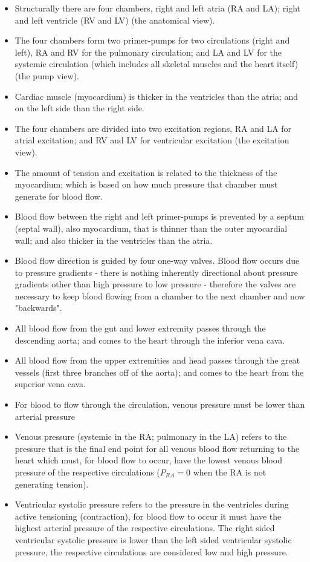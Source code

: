 \begin{itemize}
    \item Structurally there are four chambers, right and left atria (RA and LA); right and left ventricle (RV and LV) (the anatomical view).
    \item The four chambers form two primer-pumps for two circulations (right and left), RA and RV for the pulmonary circulation; and LA and LV for the systemic circulation (which includes all skeletal muscles and the heart itself) (the pump view).
    \item Cardiac muscle (myocardium) is thicker in the ventricles than the atria; and on the left side than the right side.
    \item The four chambers are divided into two excitation regions, RA and LA for atrial excitation; and RV and LV for ventricular excitation (the excitation view).
    \item The amount of tension and excitation is related to the thickness of the myocardium; which is based on how much pressure that chamber must generate for blood flow.
    \item Blood flow between the right and left primer-pumps is prevented by a septum (septal wall), also myocardium, that is thinner than the outer myocardial wall; and also thicker in the ventricles than the atria.
    \item Blood flow direction is guided by four one-way valves. Blood flow occurs due to pressure gradients - there is nothing inherently directional about pressure gradients other than high pressure to low pressure - therefore the valves are necessary to keep blood flowing from a chamber to the next chamber and now "backwards".
    \item All blood flow from the gut and lower extremity passes through the descending aorta; and comes to the heart through the inferior vena cava.
    \item All blood flow from the upper extremities and head passes through the great vessels (first three branches off of the aorta); and comes to the heart from the superior vena cava.
    \item For blood to flow through the circulation, venous pressure must be lower than arterial pressure
    \item Venous pressure (systemic in the RA; pulmonary in the LA) refers to the pressure that is the final end point for all venous blood flow returning to the heart which must, for blood flow to occur, have the lowest venous blood pressure of the respective circulations ($P_{RA} = 0$ when the RA is not generating tension). \item Ventricular systolic pressure refers to the pressure in the ventricles during active tensioning (contraction), for blood flow to occur it must have the highest arterial pressure of the respective circulations. The right sided ventricular systolic pressure is lower than the left sided ventricular systolic pressure, the respective circulations are considered low and high pressure.

\end{itemize}
